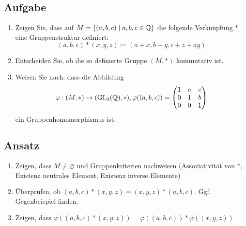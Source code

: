 \subsection{Aufgabe}
\begin{enumerate}
\item Zeigen Sie, dass auf \( M = \{ (a,b,c) \mid a,b,c \in \mathbb{Q} \} \) die folgende Verknüpfung \( \ast \) eine Gruppenstruktur definiert:
\begin{equation*}
  (a,b,c) \ast (x,y,z) \coloneqq (a+x, b+y, c+z+ay)
\end{equation*}

\item Entscheiden Sie, ob die so definierte Gruppe \( (M, \ast) \) kommutativ ist.

\item Weisen Sie nach, dass die Abbildung
\begin{equation*}
  \varphi: (M, \ast) \to (\text{GL}_3(\mathbb{Q}),*), \varphi((a,b,c)) = \begin{pmatrix}
    1 & a & c \\
    0 & 1 & b \\
    0 & 0 & 1
  \end{pmatrix} 
\end{equation*}
ein Gruppenhomomorphismus ist.
\end{enumerate}

\subsection{Ansatz}
\begin{enumerate}
	\item Zeigen, dass \( M \neq \varnothing \) und Gruppenkriterien nachweisen (Assoziativität von \( \ast \), Existenz neutrales Element, Existenz inverse Elemente)
	\item Überprüfen, ob \( (a,b,c) \ast (x,y,z) = (x,y,z) \ast (a,b,c) \). Ggf. Gegenbeispiel finden.
	\item Zeigen, dass \( \varphi((a,b,c) \ast (x,y,z)) = \varphi((a,b,c)) * \varphi((x,y,z)) \)
\end{enumerate}

